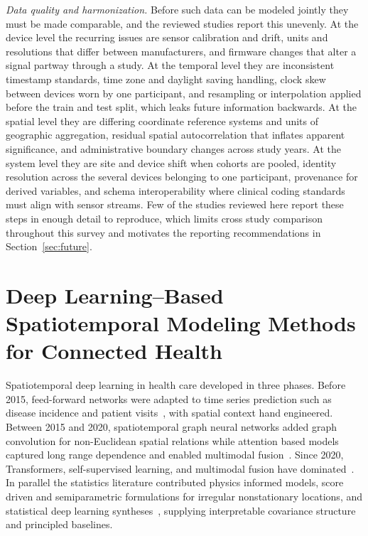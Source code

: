 \documentclass[journal]{IEEEtran}
\newif\ifsubmission
\begin{document}
\emph{Data quality and harmonization.} Before such data can be modeled jointly they must be made comparable, and the reviewed studies report this unevenly. At the device level the recurring issues are sensor calibration and drift, units and resolutions that differ between manufacturers, and firmware changes that alter a signal partway through a study. At the temporal level they are inconsistent timestamp standards, time zone and daylight saving handling, clock skew between devices worn by one participant, and resampling or interpolation applied before the train and test split, which leaks future information backwards. At the spatial level they are differing coordinate reference systems and units of geographic aggregation, residual spatial autocorrelation that inflates apparent significance, and administrative boundary changes across study years. At the system level they are site and device shift when cohorts are pooled, identity resolution across the several devices belonging to one participant, provenance for derived variables, and schema interoperability where clinical coding standards must align with sensor streams. Few of the studies reviewed here report these steps in enough detail to reproduce, which limits cross study comparison throughout this survey and motivates the reporting recommendations in Section~\ref{sec:future}.

\fi

\section{Deep Learning--Based Spatiotemporal Modeling Methods for Connected Health}
\label{sec:history}
\ifsubmission
Spatiotemporal deep learning in health care developed in three phases. Before 2015, feed-forward networks were adapted to time series prediction such as disease incidence and patient visits~\cite{miotto2018deeplearning}, with spatial context hand engineered. Between 2015 and 2020, spatiotemporal graph neural networks added graph convolution for non-Euclidean spatial relations while attention based models captured long range dependence and enabled multimodal fusion~\cite{caroprese2018deepehr}. Since 2020, Transformers, self-supervised learning, and multimodal fusion have dominated~\cite{liu2024temporallearning}. In parallel the statistics literature contributed physics informed models, score driven and semiparametric formulations for irregular nonstationary locations, and statistical deep learning syntheses~\cite{liu2022convectionDiffusion,gasperoni2023scoreDriven,castroMorales2025dynamicDeformation,wikle2023statisticalDeepLearning}, supplying interpretable covariance structure and principled baselines.
\end{document}
